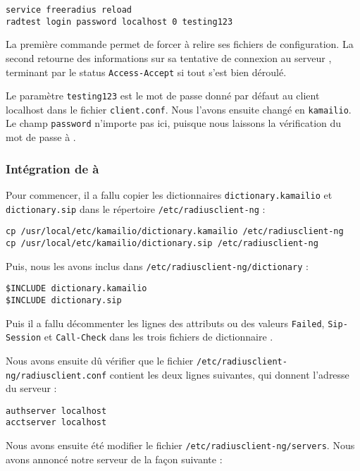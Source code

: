 \begin{verbatim}
service freeradius reload
radtest login password localhost 0 testing123
\end{verbatim}

La première commande permet de forcer {\frad} à relire ses fichiers de configuration. La second retourne des informations sur sa tentative de connexion au serveur {\frad}, terminant par le status \texttt{Access-Accept} si tout s’est bien déroulé.

Le paramètre \texttt{testing123} est le mot de passe donné par défaut au client localhost dans le fichier \texttt{client.conf}. Nous l'avons ensuite changé en \texttt{kamailio}. Le champ \texttt{password} n’importe pas ici, puisque nous laissons la vérification du mot de passe à {\kam}.

\subsubsection{Intégration de {\rad} à {\kam}}

Pour commencer, il a fallu copier les dictionnaires {\rad} \texttt{dictionary.kamailio} et \texttt{dictionary.sip} dans le répertoire \texttt{/etc/radiusclient-ng} :

\begin{verbatim}
cp /usr/local/etc/kamailio/dictionary.kamailio /etc/radiusclient-ng
cp /usr/local/etc/kamailio/dictionary.sip /etc/radiusclient-ng
\end{verbatim}

Puis, nous les avons inclus dans \texttt{/etc/radiusclient-ng/dictionary} :

\begin{verbatim}
$INCLUDE dictionary.kamailio
$INCLUDE dictionary.sip
\end{verbatim}

Puis il a fallu décommenter les lignes des attributs ou des valeurs \texttt{Failed}, \texttt{Sip-Session} et \texttt{Call-Check} dans les trois fichiers de dictionnaire {\rad}.

Nous avons ensuite dû vérifier que le fichier \texttt{/etc/radiusclient-ng/radiusclient.conf} contient les deux lignes suivantes, qui donnent l'adresse du serveur {\rad} :

\begin{verbatim}
authserver localhost
acctserver localhost
\end{verbatim}

Nous avons ensuite été modifier le fichier \texttt{/etc/radiusclient-ng/servers}. Nous avons annoncé notre serveur de la façon suivante :

